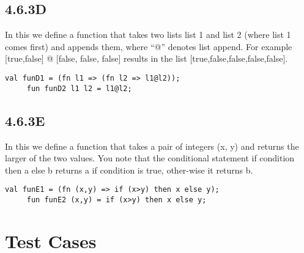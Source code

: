 \documentclass{report}
\begin{document}
 \subsection{4.6.3D}
 \label{sec:4.6.3d}

 In this we define a function that takes two lists list 1 and list 2
 (where list 1 comes first) and appends them, where “@” denotes list
 append. For example [true,false] @ [false, false, false] results in
 the list [true,false,false,false,false].


   \lstset{frameround=tttt}
    \begin{lstlisting}[frame=tRBL]
     val funD1 = (fn l1 => (fn l2 => l1@l2));
     fun funD2 l1 l2 = l1@l2; 
    \end{lstlisting}



 \subsection{4.6.3E}
 \label{sec:4.6.3e}

 In this we define a function that takes a pair of integers (x, y) and
 returns the larger of the two values. You note that the conditional
 statement if condition then a else b returns a if condition is true,
 other-wise it returns b.


   \lstset{frameround=tttt}
    \begin{lstlisting}[frame=tRBL]
     val funE1 = (fn (x,y) => if (x>y) then x else y);
     fun funE2 (x,y) = if (x>y) then x else y;
    \end{lstlisting}

\section{Test Cases}
\label{sec:test-cases}
\end{document}
